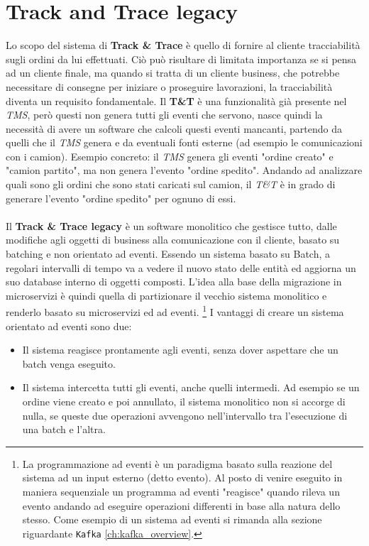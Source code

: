 \section{Track and Trace legacy}
\label{sec:T&T_old}
Lo scopo del sistema di \textbf{Track \& Trace}  è quello di fornire al cliente tracciabilità sugli ordini da lui effettuati.
Ciò può risultare di limitata importanza se si pensa ad un cliente finale, ma quando si tratta di un cliente business,
che potrebbe necessitare di consegne per iniziare o proseguire lavorazioni, la tracciabilità diventa un requisito fondamentale.
Il \textbf{T\&T} è una funzionalità già presente nel \textit{TMS}, però questi non genera tutti gli eventi che servono,
nasce quindi la necessità di avere un software che calcoli questi eventi mancanti, partendo da quelli che il \textit{TMS} genera e da eventuali fonti esterne (ad esempio le comunicazioni con i camion). 
Esempio concreto: il \textit{TMS} genera gli eventi "ordine creato" e "camion partito", ma non genera l'evento "ordine spedito". 
Andando ad analizzare quali sono gli ordini che sono stati caricati sul camion, il \textit{T\&T} è in grado di generare l'evento "ordine spedito" per ognuno di essi.
\\\\
Il \textbf{Track \& Trace legacy} è un software monolitico che gestisce tutto, dalle modifiche agli oggetti di business alla comunicazione con il cliente, basato su batching e non orientato ad eventi.
Essendo un sistema basato su Batch, a regolari intervalli di tempo va a vedere il nuovo stato delle entità ed aggiorna un suo database interno di oggetti composti.
L'idea alla base della migrazione in microservizi è quindi quella di partizionare il vecchio sistema monolitico e renderlo basato su microservizi ed ad eventi.
\footnote{La programmazione ad eventi è un paradigma basato sulla reazione del sistema ad un input esterno (detto evento). 
Al posto di venire eseguito in maniera sequenziale un programma ad eventi "reagisce" quando rileva un evento andando ad eseguire operazioni differenti in base alla natura dello stesso.
Come esempio di un sistema ad eventi si rimanda alla sezione riguardante \texttt{Kafka} \ref{ch:kafka_overview}.}
I vantaggi di creare un sistema orientato ad eventi sono due:
\begin{itemize}
    \item Il sistema reagisce prontamente agli eventi, senza dover aspettare che un batch venga eseguito.
    \item Il sistema intercetta tutti gli eventi, anche quelli intermedi. Ad esempio se un ordine viene creato e poi annullato, il sistema monolitico non si accorge di nulla, se queste due operazioni avvengono nell'intervallo tra l'esecuzione di una batch e l'altra. 
\end{itemize}
